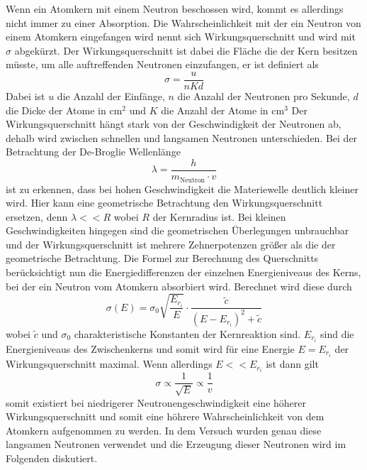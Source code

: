 Wenn ein Atomkern mit einem Neutron beschossen wird, kommt es allerdings nicht immer zu einer Absorption. Die Wahrscheinlichkeit mit der ein Neutron von einem Atomkern eingefangen wird nennt sich
Wirkungsquerschnitt und wird mit $\sigma$ abgekürzt.
Der Wirkungsquerschnitt ist dabei die Fläche die der Kern besitzen müsste, um alle auftreffenden Neutronen einzufangen, er ist definiert als
\begin{equation}
\sigma = \frac{u}{nKd}
\end{equation}
Dabei ist $u$ die Anzahl der Einfänge, $n$ die Anzahl der Neutronen pro Sekunde, $d$ die Dicke der Atome in $\si{\centi\meter\squared}$ und $K$ die Anzahl der Atome in $\si{\centi\meter\cubed}$
Der Wirkungsquerschnitt hängt stark von der Geschwindigkeit der Neutronen ab, dehalb wird zwischen schnellen und langsamen Neutronen unterschieden.
Bei der Betrachtung der De-Broglie Wellenlänge
\begin{equation}
\lambda = \frac{h}{m_{\text{Neutron}} \cdot v} 
\end{equation}
ist zu erkennen, dass bei hohen Geschwindigkeit die Materiewelle deutlich kleiner wird. Hier kann eine geometrische Betrachtung den Wirkungsquerschnitt ersetzen, denn $\lambda << R$ wobei $R$ der Kernradius ist.
Bei kleinen Geschwindigkeiten hingegen sind die geometrischen Überlegungen unbrauchbar und der Wirkungsquerschnitt ist mehrere Zehnerpotenzen größer als die der geometrische Betrachtung.
Die Formel zur Berechnung des Querschnitts berücksichtigt nun die Energiedifferenzen der einzelnen Energieniveaus des Kerns, bei der ein Neutron vom Atomkern absorbiert wird.
Berechnet wird diese durch
\begin{equation}
\sigma(E) = \sigma_{0} \sqrt{\frac{E_{r_{i}}}{E}} \cdot \frac{\tilde{c}}{(E - E_{r_{i}})^{2} + \tilde{c}}
\end{equation}
wobei $\tilde c$ und $\sigma_{0}$ charakteristische Konstanten der Kernreaktion sind. $E_{{r}_{i}}$ sind die Energieniveaus des Zwischenkerns und somit wird für eine Energie $E = E_{{r}_{i}}$
der Wirkungsquerschnitt maximal. Wenn allerdings $E << E_{{r}_{i}}$ ist dann gilt
\begin{equation}
\sigma \propto \frac{1}{\sqrt{E}} \propto \frac{1}{v}
\end{equation}
somit existiert bei niedrigerer Neutronengeschwindigkeit eine höherer Wirkungsquerschnitt und somit eine höhrere Wahrscheinlichkeit von dem Atomkern aufgenommen zu werden.
In dem Versuch wurden genau diese langsamen Neutronen verwendet und die Erzeugung dieser Neutronen wird im Folgenden diskutiert.

